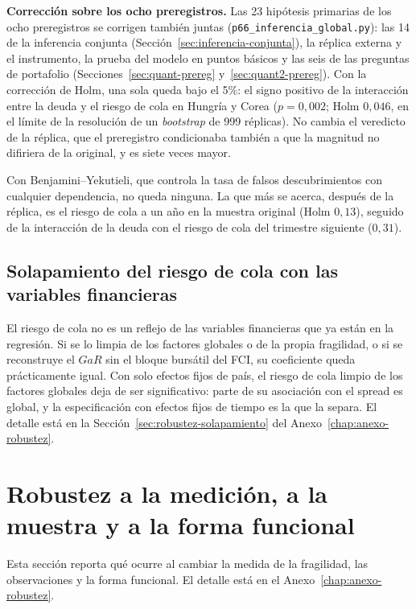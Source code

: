 \textbf{Corrección sobre los ocho preregistros.} Las 23 hipótesis primarias de los ocho preregistros se corrigen también juntas (\texttt{p66\_inferencia\_global.py}): las 14 de la inferencia conjunta (Sección~\ref{sec:inferencia-conjunta}), la réplica externa y el instrumento, la prueba del modelo en puntos básicos y las seis de las preguntas de portafolio (Secciones~\ref{sec:quant-prereg} y~\ref{sec:quant2-prereg}). Con la corrección de Holm, una sola queda bajo el 5\%: el signo positivo de la interacción entre la deuda y el riesgo de cola en Hungría y Corea ($p=0{,}002$; Holm $0{,}046$, en el límite de la resolución de un \textit{bootstrap} de 999 réplicas). No cambia el veredicto de la réplica, que el preregistro condicionaba también a que la magnitud no difiriera de la original, y es siete veces mayor.

Con Benjamini--Yekutieli, que controla la tasa de falsos descubrimientos con cualquier dependencia, no queda ninguna. La que más se acerca, después de la réplica, es el riesgo de cola a un año en la muestra original (Holm $0{,}13$), seguido de la interacción de la deuda con el riesgo de cola del trimestre siguiente ($0{,}31$).

\subsection{Solapamiento del riesgo de cola con las variables financieras}

El riesgo de cola no es un reflejo de las variables financieras que ya están en la regresión. Si se lo limpia de los factores globales o de la propia fragilidad, o si se reconstruye el $GaR$ sin el bloque bursátil del FCI, su coeficiente queda prácticamente igual. Con solo efectos fijos de país, el riesgo de cola limpio de los factores globales deja de ser significativo: parte de su asociación con el spread es global, y la especificación con efectos fijos de tiempo es la que la separa. El detalle está en la Sección~\ref{sec:robustez-solapamiento} del Anexo~\ref{chap:anexo-robustez}.

\section{Robustez a la medición, a la muestra y a la forma funcional}
\label{sec:robustez-resumen}

Esta sección reporta qué ocurre al cambiar la medida de la fragilidad, las observaciones y la forma funcional. El detalle está en el Anexo~\ref{chap:anexo-robustez}.

